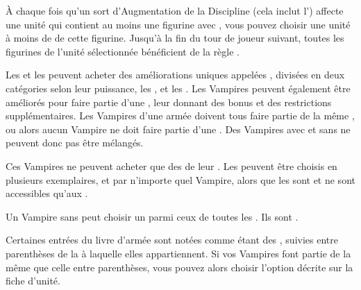 {À chaque fois qu'un sort d'Augmentation de la Discipline \necromancy{} (cela inclut l'\necromancyattribute{}) affecte une unité qui contient au moins une figurine avec \wakethedead{}, vous pouvez choisir une unité à moins de  de cette figurine. Jusqu'à la fin du tour de joueur suivant, toutes les figurines de l'unité sélectionnée bénéficient de la règle \lightningreflexes{}.

\armyspecialruleentry{\necromanticaura}



\closearmyspecialrules



Les \vampirelords{} et les \vampireheroes{} peuvent acheter des améliorations uniques appelées \bloodpowers{}, divisées en deux catégories selon leur puissance, les \bloodlinepowers{}, et les \ancientbloodpowers{}. Les Vampires peuvent également être améliorés pour faire partie d'une \bloodline{}, leur donnant des bonus et des restrictions supplémentaires. Les Vampires d'une armée doivent tous faire partie de la même \bloodline{}, ou alors aucun Vampire ne doit faire partie d'une \bloodline{}. Des Vampires avec et sans \bloodline{} ne peuvent donc pas être mélangés.


Ces Vampires ne peuvent acheter que des \bloodpowers{} de leur \bloodline{}. Les \bloodlinepowers{} peuvent être choisis en plusieurs exemplaires, et par n'importe quel Vampire, alors que les \ancientbloodpowers{} sont \oneofakind{} et ne sont accessibles qu'aux \vampirelords{}.


Un Vampire sans \bloodline{} peut choisir un \bloodlinepowers{} parmi ceux de toutes les \bloodlines{}. Ils sont \oneofakind{}.


Certaines entrées du livre d'armée sont notées comme étant des \bloodties{}, suivies entre parenthèses de la \bloodline{} à laquelle elles appartiennent. Si vos Vampires font partie de la même \bloodline{} que celle entre parenthèses, vous pouvez alors choisir l'option décrite sur la fiche d'unité.

}
